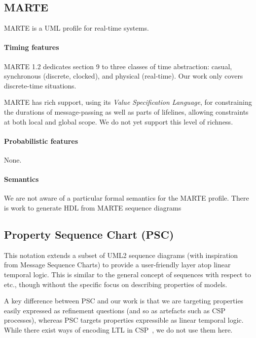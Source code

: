 \subsection{MARTE}

MARTE is a UML profile for real-time systems.

\paragraph{Timing features}
MARTE 1.2 dedicates section 9 to three classes of time abstraction:
casual, synchronous (discrete, clocked), and physical (real-time).  Our work
only covers discrete-time
situations.

MARTE has rich support, using its \emph{Value Specification Language}, for
constraining the durations of message-passing as well as parts of lifelines,
allowing constraints at both local
and global scope.  We do not yet support this level of richness.

\paragraph{Probabilistic features}
None.  

\paragraph{Semantics}
We are not aware of a particular formal semantics for the MARTE profile.
There is work to generate HDL from MARTE sequence diagrams~

\subsection{Property Sequence Chart (PSC)}

This notation extends a subset of UML2 sequence diagrams (with inspiration from
Message Sequence Charts) to provide a
user-friendly layer atop linear temporal logic.  This is
similar to the general concept of \langname{} sequences with respect to \tockcsp{}
etc., though without the
specific focus on describing properties of \robochart{} models.

A key difference between PSC and our work is that we are
targeting  properties easily expressed as refinement questions
(and so as artefacts such as CSP processes), whereas PSC targets properties
expressible as linear temporal logic.  While there exist ways of encoding LTL
in CSP~\cite{fdrspin}, we do not  use them here.

